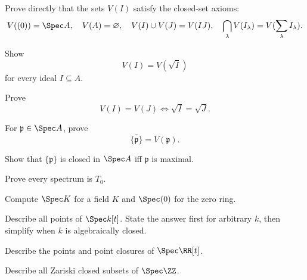 \begin{exercise}
Prove directly that the sets $V(I)$ satisfy the closed-set axioms:
\[
V((0))=\Spec A,\quad V(A)=\varnothing,\quad
V(I)\cup V(J)=V(IJ),\quad
\bigcap_\lambda V(I_\lambda)=V(\sum_\lambda I_\lambda).
\]
\end{exercise}

\begin{exercise}
Show
\[
V(I)=V(\sqrt I)
\]
for every ideal $I\subseteq A$.
\end{exercise}

\begin{exercise}
Prove
\[
V(I)=V(J)\Longleftrightarrow \sqrt I=\sqrt J.
\]
\end{exercise}

\begin{exercise}
For $\mathfrak p\in\Spec A$, prove
\[
\overline{\{\mathfrak p\}}=V(\mathfrak p).
\]
\end{exercise}

\begin{exercise}
Show that $\{\mathfrak p\}$ is closed in $\Spec A$ iff $\mathfrak p$ is maximal.
\end{exercise}

\begin{exercise}
Prove every spectrum is $T_0$.
\end{exercise}

\begin{exercise}
Compute $\Spec K$ for a field $K$ and $\Spec(0)$ for the zero ring.
\end{exercise}

\begin{exercise}
Describe all points of $\Spec k[t]$.  State the answer first for arbitrary $k$, then simplify
when $k$ is algebraically closed.
\end{exercise}

\begin{exercise}
Describe the points and point closures of $\Spec\RR[t]$.
\end{exercise}

\begin{exercise}
Describe all Zariski closed subsets of $\Spec\ZZ$.
\end{exercise}

